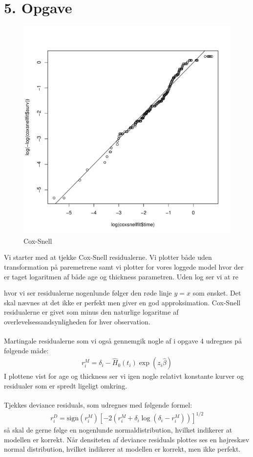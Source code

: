 \chapter{5. Opgave}
\begin{figure}[h]
    \centering
    \includegraphics[width=0.5\linewidth]{Basses_kode/Billeder_duration/log_Cox_Snell_residualer.pdf}
    \caption{Cox-Snell}
    \label{fig:enter-label}
\end{figure}
Vi starter med at tjekke Cox-Snell residualerne. Vi plotter både uden transformation på paremetrene samt vi plotter for vores loggede model hvor der er taget logaritmen af både age og thickness parametren. Uden log ser vi at re

hvor vi ser residualerne nogenlunde følger den røde linje $y=x$ som ønsket. Det skal nævnes at det ikke er perfekt men giver en god approksimation. Cox-Snell residualerne er givet som minus den naturlige logaritme af overlevelsessandsynligheden for hver observation.\\\\
Martingale residualerne som vi også gennemgik nogle af i opgave 4 udregnes på følgende måde:
\begin{align*}
    r_i^M = \delta_i - \hat{H}_0(t_i) \exp(z_i \hat{\beta})
\end{align*}
I plottene vist for age og thickness ser vi igen nogle relativt konstante kurver og residualer som er spredt ligeligt omkring.\\\\

\noindent Tjekkes deviance residuals, som udregnes med følgende formel: 
\begin{align}
r_i^D = \text{sign}(r_i^M) \left[ -2 \left( r_i^M + \delta_i \log(\delta_i - r_i^M) \right) \right]^{1/2}
\end{align} 
så skal de gerne følge en nogenlunde normaldistribution, hvilket indikerer at modellen er korrekt. Når densiteten af deviance residuals plottes ses en højreskæv normal distribution, hvilket indikerer at modellen er korrekt, men ikke perfekt.\\\\

